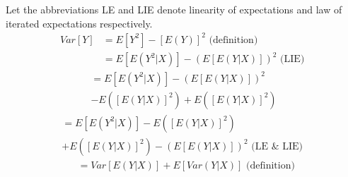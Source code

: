 
Let the abbreviations LE and LIE denote linearity of expectations and law of iterated expectations respectively.
\begin{align}
Var [Y] &= E[Y^2] -[E(Y)]^2\text{  (definition)  }\\
        &= E[E(Y^2 | X )] - (E[E(Y | X)])^2\text{  (LIE)  }
\end{align}
\begin{multline}
    =E[E(Y^2 | X )] - (E[E(Y | X)])^2\\-E([E(Y | X)]^2) + E([E(Y | X)]^2)
\end{multline}
\begin{multline}
        =E[E(Y^2 | X )] - E([E(Y | X)]^2) \\ + E([E(Y | X)]^2) - (E[E(Y | X)])^2\text{  (LE {\&} LIE)  }
\end{multline}
\begin{align}
        &= Var [E(Y | X)] + E[Var (Y | X)]\text{  (definition)  }
\end{align}
\bigskip
{}